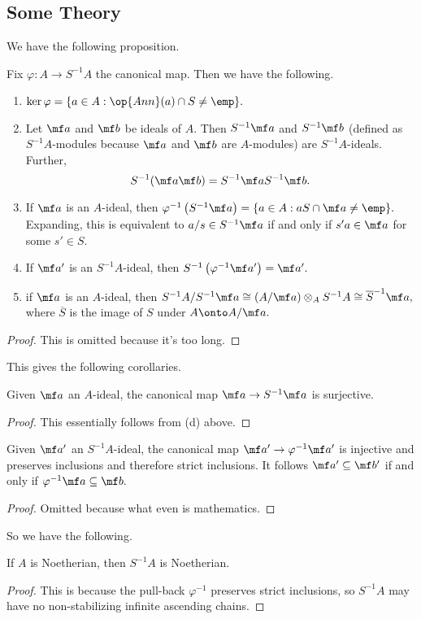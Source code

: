 \documentclass[../notes.tex]{subfiles}
\begin{document}
\subsection{Some Theory}
We have the following proposition.
\begin{proposition}
    Fix $\varphi:A\to S^{-1}A$ the canonical map. Then we have the following.
    \begin{enumerate}[label=(\alph*)]
        \item $\ker\varphi=\{a\in A:\op{Ann}(a)\cap S\ne\emp\}.$
        \item Let $\mf a$ and $\mf b$ be ideals of $A.$ Then $S^{-1}\mf a$ and $S^{-1}\mf b$ (defined as $S^{-1}A$-modules because $\mf a$ and $\mf b$ are $A$-modules) are $S^{-1}A$-ideals. Further,
        \[S^{-1}(\mf a\mf b)=S^{-1}\mf aS^{-1}\mf b.\]
        \item If $\mf a$ is an $A$-ideal, then $\varphi^{-1}\left(S^{-1}\mf a\right)=\{a\in A:aS\cap\mf a\ne\emp\}.$ Expanding, this is equivalent to $a/s\in S^{-1}\mf a$ if and only if $s'a\in\mf a$ for some $s'\in S.$
        \item If $\mf a'$ is an $S^{-1}A$-ideal, then $S^{-1}\left(\varphi^{-1}\mf a'\right)=\mf a'.$
        \item if $\mf a$ is an $A$-ideal, then $S^{-1}A/S^{-1}\mf a\cong(A/\mf a)\otimes_AS^{-1}A\cong\overline S^{-1}\mf a,$ where $\overline S$ is the image of $S$ under $A\onto A/\mf a.$
    \end{enumerate}
\end{proposition}
\begin{proof}
    This is omitted because it's too long.
\end{proof}
This gives the following corollaries.
\begin{corollary}
    Given $\mf a$ an $A$-ideal, the canonical map $\mf a\to S^{-1}\mf a$ is surjective.
\end{corollary}
\begin{proof}
    This essentially follows from (d) above.
\end{proof}
\begin{corollary}
    Given $\mf a'$ an $S^{-1}A$-ideal, the canonical map $\mf a'\to\varphi^{-1}\mf a'$ is injective and preserves inclusions and therefore strict inclusions. It follows $\mf a'\subseteq\mf b'$ if and only if $\varphi^{-1}\mf a\subseteq\mf b.$
\end{corollary}
\begin{proof}
    Omitted because what even is mathematics.
\end{proof}
So we have the following.
\begin{proposition}
    If $A$ is Noetherian, then $S^{-1}A$ is Noetherian.
\end{proposition}
\begin{proof}
    This is because the pull-back $\varphi^{-1}$ preserves strict inclusions, so $S^{-1}A$ may have no non-stabilizing infinite ascending chains.
\end{proof}
\end{document}
